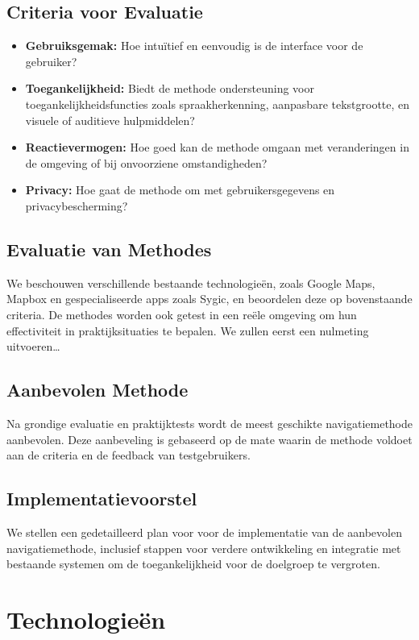 \subsection{Criteria voor Evaluatie}
\begin{itemize}
    \item \textbf{Gebruiksgemak:} Hoe intuïtief en eenvoudig is de interface voor de gebruiker?
    \item \textbf{Toegankelijkheid:} Biedt de methode ondersteuning voor toegankelijkheidsfuncties zoals spraakherkenning, aanpasbare tekstgrootte, en visuele of auditieve hulpmiddelen?
    \item \textbf{Reactievermogen:} Hoe goed kan de methode omgaan met veranderingen in de omgeving of bij onvoorziene omstandigheden?
    \item \textbf{Privacy:} Hoe gaat de methode om met gebruikersgegevens en privacybescherming?
\end{itemize}

\subsection{Evaluatie van Methodes}
We beschouwen verschillende bestaande technologieën, zoals Google Maps, Mapbox en gespecialiseerde apps zoals Sygic, en beoordelen deze op bovenstaande criteria. De methodes worden ook getest in een reële omgeving om hun effectiviteit in praktijksituaties te bepalen. We zullen eerst een nulmeting uitvoeren\ldots

\subsection{Aanbevolen Methode}
Na grondige evaluatie en praktijktests wordt de meest geschikte navigatiemethode aanbevolen. Deze aanbeveling is gebaseerd op de mate waarin de methode voldoet aan de criteria en de feedback van testgebruikers.

\subsection{Implementatievoorstel}
We stellen een gedetailleerd plan voor voor de implementatie van de aanbevolen navigatiemethode, inclusief stappen voor verdere ontwikkeling en integratie met bestaande systemen om de toegankelijkheid voor de doelgroep te vergroten.

\section{Technologieën}
\label{sec:technologieën}


